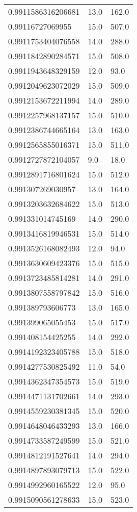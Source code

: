 \begin{center}
\begin{supertabular}[H]{p{0.30\textwidth}p{0.05\textwidth}p{0.05\textwidth}}
0.9911586316206681 & 13.0 & 162.0 \\ 
0.99116727069955 & 15.0 & 507.0 \\ 
0.9911753404076558 & 14.0 & 288.0 \\ 
0.9911842890284571 & 15.0 & 508.0 \\ 
0.9911943648329159 & 12.0 & 93.0 \\ 
0.9912049623072029 & 15.0 & 509.0 \\ 
0.9912153672211994 & 14.0 & 289.0 \\ 
0.9912257968137157 & 15.0 & 510.0 \\ 
0.9912386744665164 & 13.0 & 163.0 \\ 
0.9912565855016371 & 15.0 & 511.0 \\ 
0.9912727872104057 & 9.0 & 18.0 \\ 
0.9912891716801624 & 15.0 & 512.0 \\ 
0.991307269030957 & 13.0 & 164.0 \\ 
0.9913203632684622 & 15.0 & 513.0 \\ 
0.991331014745169 & 14.0 & 290.0 \\ 
0.9913416819946531 & 15.0 & 514.0 \\ 
0.9913526168082493 & 12.0 & 94.0 \\ 
0.9913630609423376 & 15.0 & 515.0 \\ 
0.9913723485814281 & 14.0 & 291.0 \\ 
0.9913807558797842 & 15.0 & 516.0 \\ 
0.991389793606773 & 13.0 & 165.0 \\ 
0.991399065055453 & 15.0 & 517.0 \\ 
0.991408154425255 & 14.0 & 292.0 \\ 
0.9914192323405788 & 15.0 & 518.0 \\ 
0.9914277530825492 & 11.0 & 54.0 \\ 
0.9914362347354573 & 15.0 & 519.0 \\ 
0.9914471131702661 & 14.0 & 293.0 \\ 
0.9914559230381345 & 15.0 & 520.0 \\ 
0.9914648046433293 & 13.0 & 166.0 \\ 
0.9914733587249599 & 15.0 & 521.0 \\ 
0.9914812191527641 & 14.0 & 294.0 \\ 
0.9914897893079713 & 15.0 & 522.0 \\ 
0.9914992960165522 & 12.0 & 95.0 \\ 
0.9915090561278633 & 15.0 & 523.0 \\ 

\end{supertabular}
\end{center}
